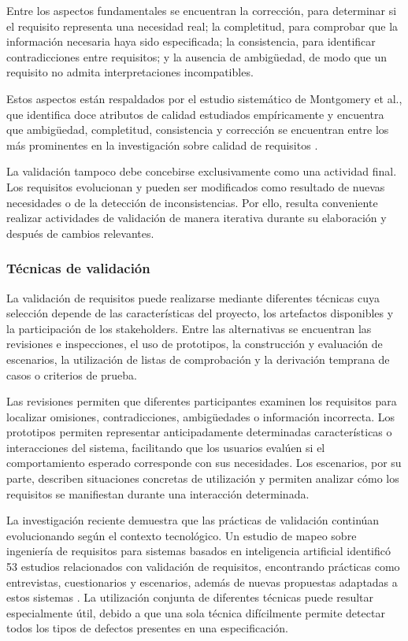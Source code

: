 \documentclass[journal,onecolumn]{IEEEtran}
\begin{document}
	Entre los aspectos fundamentales se encuentran la corrección, para determinar si el requisito representa una necesidad real; la completitud, para comprobar que la información necesaria haya sido especificada; la consistencia, para identificar contradicciones entre requisitos; y la ausencia de ambigüedad, de modo que un requisito no admita interpretaciones incompatibles.
	
	Estos aspectos están respaldados por el estudio sistemático de Montgomery et al., que identifica doce atributos de calidad estudiados empíricamente y encuentra que ambigüedad, completitud, consistencia y corrección se encuentran entre los más prominentes en la investigación sobre calidad de requisitos \cite{Montgomery2022}.
	
	La validación tampoco debe concebirse exclusivamente como una actividad final. Los requisitos evolucionan y pueden ser modificados como resultado de nuevas necesidades o de la detección de inconsistencias. Por ello, resulta conveniente realizar actividades de validación de manera iterativa durante su elaboración y después de cambios relevantes.
	
	\subsubsection{Técnicas de validación}
	
	La validación de requisitos puede realizarse mediante diferentes técnicas cuya selección depende de las características del proyecto, los artefactos disponibles y la participación de los stakeholders. Entre las alternativas se encuentran las revisiones e inspecciones, el uso de prototipos, la construcción y evaluación de escenarios, la utilización de listas de comprobación y la derivación temprana de casos o criterios de prueba.
	
	Las revisiones permiten que diferentes participantes examinen los requisitos para localizar omisiones, contradicciones, ambigüedades o información incorrecta. Los prototipos permiten representar anticipadamente determinadas características o interacciones del sistema, facilitando que los usuarios evalúen si el comportamiento esperado corresponde con sus necesidades. Los escenarios, por su parte, describen situaciones concretas de utilización y permiten analizar cómo los requisitos se manifiestan durante una interacción determinada.
	
	La investigación reciente demuestra que las prácticas de validación continúan evolucionando según el contexto tecnológico. Un estudio de mapeo sobre ingeniería de requisitos para sistemas basados en inteligencia artificial identificó 53 estudios relacionados con validación de requisitos, encontrando prácticas como entrevistas, cuestionarios y escenarios, además de nuevas propuestas adaptadas a estos sistemas \cite{Habiba2024}. La utilización conjunta de diferentes técnicas puede resultar especialmente útil, debido a que una sola técnica difícilmente permite detectar todos los tipos de defectos presentes en una especificación.
	
\end{document}

